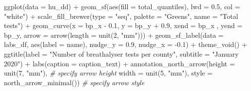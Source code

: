 \documentclass[
]{book}
\newenvironment{Shaded}{\begin{snugshade}}{\end{snugshade}}
\newcommand{\AttributeTok}[1]{\textcolor[rgb]{0.77,0.63,0.00}{#1}}
\newcommand{\CommentTok}[1]{\textcolor[rgb]{0.56,0.35,0.01}{\textit{#1}}}
\newcommand{\DecValTok}[1]{\textcolor[rgb]{0.00,0.00,0.81}{#1}}
\newcommand{\FloatTok}[1]{\textcolor[rgb]{0.00,0.00,0.81}{#1}}
\newcommand{\FunctionTok}[1]{\textcolor[rgb]{0.00,0.00,0.00}{#1}}
\newcommand{\NormalTok}[1]{#1}
\newcommand{\SpecialCharTok}[1]{\textcolor[rgb]{0.00,0.00,0.00}{#1}}
\newcommand{\StringTok}[1]{\textcolor[rgb]{0.31,0.60,0.02}{#1}}
\begin{document}
\begin{Shaded}
\begin{Highlighting}[]
\FunctionTok{ggplot}\NormalTok{(}\AttributeTok{data =}\NormalTok{ hu\_dd) }\SpecialCharTok{+} 
  \FunctionTok{geom\_sf}\NormalTok{(}\FunctionTok{aes}\NormalTok{(}\AttributeTok{fill =}\NormalTok{ total\_quantiles), }
          \AttributeTok{lwd =} \FloatTok{0.5}\NormalTok{, }\AttributeTok{col =} \StringTok{"white"}\NormalTok{) }\SpecialCharTok{+} 
  \FunctionTok{scale\_fill\_brewer}\NormalTok{(}\AttributeTok{type =} \StringTok{"seq"}\NormalTok{, }
                    \AttributeTok{palette =} \StringTok{"Greens"}\NormalTok{, }
                    \AttributeTok{name =} \StringTok{"Total tests"}\NormalTok{) }\SpecialCharTok{+} 
  \FunctionTok{geom\_curve}\NormalTok{(}\AttributeTok{x =}\NormalTok{ bp\_x }\SpecialCharTok{{-}} \FloatTok{0.1}\NormalTok{, }
             \AttributeTok{y =}\NormalTok{ bp\_y }\SpecialCharTok{+} \FloatTok{0.9}\NormalTok{, }
             \AttributeTok{xend =}\NormalTok{ bp\_x , }
             \AttributeTok{yend =}\NormalTok{ bp\_y, }
             \AttributeTok{arrow =} \FunctionTok{arrow}\NormalTok{(}\AttributeTok{length =} \FunctionTok{unit}\NormalTok{(}\DecValTok{2}\NormalTok{, }\StringTok{"mm"}\NormalTok{))) }\SpecialCharTok{+}
  \FunctionTok{geom\_sf\_label}\NormalTok{(}\AttributeTok{data =}\NormalTok{ labs\_df, }
                \FunctionTok{aes}\NormalTok{(}\AttributeTok{label =}\NormalTok{ name), }
                \AttributeTok{nudge\_y =} \FloatTok{0.9}\NormalTok{, }
                \AttributeTok{nudge\_x =} \SpecialCharTok{{-}}\FloatTok{0.1}\NormalTok{) }\SpecialCharTok{+} 
  \FunctionTok{theme\_void}\NormalTok{() }\SpecialCharTok{+} 
  \FunctionTok{ggtitle}\NormalTok{(}\AttributeTok{label =} \StringTok{"Number of breathalyser tests per county"}\NormalTok{, }
          \AttributeTok{subtitle =} \StringTok{"January 2020"}\NormalTok{) }\SpecialCharTok{+} 
  \FunctionTok{labs}\NormalTok{(}\AttributeTok{caption =}\NormalTok{ caption\_text) }\SpecialCharTok{+} 
  \FunctionTok{annotation\_north\_arrow}\NormalTok{(}\AttributeTok{height =} \FunctionTok{unit}\NormalTok{(}\DecValTok{7}\NormalTok{, }\StringTok{"mm"}\NormalTok{), }\CommentTok{\# specify arrow height}
                         \AttributeTok{width =} \FunctionTok{unit}\NormalTok{(}\DecValTok{5}\NormalTok{, }\StringTok{"mm"}\NormalTok{), }
                        \AttributeTok{style =} \FunctionTok{north\_arrow\_minimal}\NormalTok{()) }\CommentTok{\# specify arrow style}
\end{Highlighting}
\end{Shaded}
\end{document}
